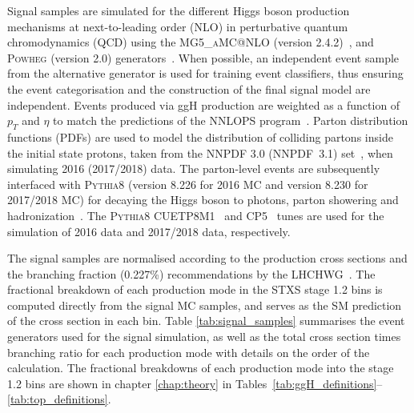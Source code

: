 Signal samples are simulated for the different Higgs boson production mechanisms at next-to-leading order (NLO) in perturbative quantum chromodynamics (QCD) using the \textsc{MG5\_aMC@NLO} (version 2.4.2)~\cite{Alwall:2014hca}, and \textsc{Powheg} (version 2.0) generators~\cite{Nason:2004rx,Frixione:2007vw,Alioli:2008tz,Nason:2009ai,Alioli:2010xd,Hartanto:2015uka}. When possible, an independent event sample from the alternative generator is used for training event classifiers, thus ensuring the event categorisation and the construction of the final signal model are independent. Events produced via ggH production are weighted as a function of $p_T$ and $\eta$ to match the predictions of the NNLOPS program~\cite{Hamilton:2013fea}. Parton distribution functions (PDFs) are used to model the distribution of colliding partons inside the initial state protons, taken from the NNPDF 3.0 (NNPDF~3.1) set~\cite{Ball:2014uwa,Ball:2017nwa}, when simulating 2016 (2017/2018) data. The parton-level events are subsequently interfaced with \textsc{Pythia8} (version 8.226 for 2016 MC and version 8.230 for 2017/2018 MC) for decaying the Higgs boson to photons, parton showering and hadronization~\cite{Sjostrand:2014zea}. The \textsc{Pythia8} CUETP8M1~\cite{Khachatryan:2015pea} and CP5~\cite{Sirunyan:2019dfx} tunes are used for the simulation of 2016 data and 2017/2018 data, respectively.

The signal samples are normalised according to the production cross sections and the \Hgg branching fraction (0.227\%) recommendations by the LHCHWG~\cite{deFlorian:2016spz}. The fractional breakdown of each production mode in the STXS stage 1.2 bins is computed directly from the signal MC samples, and serves as the SM prediction of the cross section in each bin. Table \ref{tab:signal_samples} summarises the event generators used for the signal simulation, as well as the total cross section times branching ratio for each production mode with details on the order of the calculation. The fractional breakdowns of each production mode into the stage 1.2 bins are shown in chapter \ref{chap:theory} in Tables~\ref{tab:ggH_definitions}--\ref{tab:top_definitions}.

